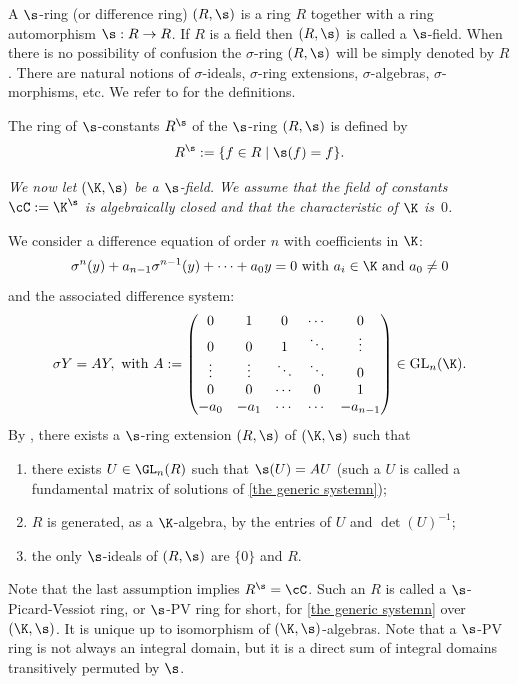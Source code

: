 A $\s$-ring (or difference ring) $(R,\s)$ is a ring $R$ together with a ring automorphism $\s : R \to R$. If $R$ is a field then $(R,\s)$ is called a $\s$-field. When there is no possibility of confusion the $\sigma$-ring $(R,\s)$ will be simply denoted by $R$. There are natural notions of $\sigma$-ideals, $\sigma$-ring extensions, $\sigma$-algebras, $\sigma$-morphisms, etc. We refer to \cite[Chap.\,1]{VdPS97} for the definitions.

The ring of $\s$-constants $R^{\s}$ of the $\s$-ring $(R,\s)$ is defined by
\[
R^{\s}:=\{f \in R \mid \s(f)=f\}.
\]

\emph{We now let $(\K,\s)$ be a $\s$-field. We assume that the field of constants $\cC:=\K^{\s}$ is algebraically closed and that the characteristic of $\K$ is~$0$.}

We consider a difference equation of order $n$ with coefficients in $\K$:
\begin{equation} \label{equation d ordre n}
\sigma^{n}(y)+a_{n-1}\sigma^{n-1}(y)+\dots+a_0y=0 \text{ with } a_i \in \K \text{ and } a_0\neq 0
\end{equation}
and the associated difference system:
\begin{equation}\label{the generic systemn}
\sigma Y=A Y, \hbox{ with } A :=\begin{pmatrix}
0&1&0&\cdots&0\\
0&0&1&\ddots&\vdots\\
\vdots&\vdots&\ddots&\ddots&0\\
0&0&\cdots&0&1\\
-a_{0}& -a_{1}&\cdots & \cdots & -a_{n-1}
\end{pmatrix} \in \mathrm{GL}_{n}(\K).
\end{equation}
By \cite[\S1.1]{VdPS97}, there exists a $\s$-ring extension $(R,\s)$ of $(\K,\s)$ such that
\begin{enumerate}
\item
there exists $U \in \GL_{n}(R)$ such that $\s (U) = AU$ (such a $U$ is called a fundamental matrix of solutions of \eqref{the generic systemn});
\item
$R$ is generated, as a $\K$-algebra, by the entries of $U$ and $\det(U)^{-1}$;
\item
the only $\s$-ideals of $(R,\s)$ are $\{0\}$ and $R$.
\end{enumerate}

Note that the last assumption implies $R^{\s}=\cC$.
Such an $R$ is called a $\s$-Picard-Vessiot ring, or $\s$-PV ring for short, for \eqref{the generic systemn} over $(\K,\s)$. It is unique up to isomorphism of $(\K,\s)$-algebras. Note that a $\s$-PV ring is not always an integral domain, but it is a direct sum of integral domains transitively permuted by $\s$.

